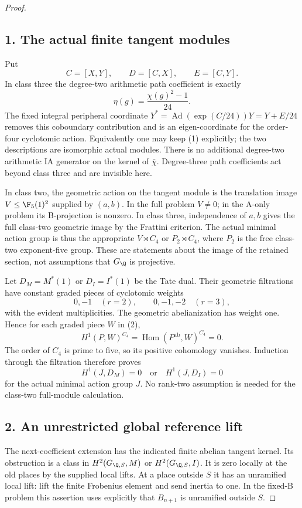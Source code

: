 \begin{proof}
\subsection*{1. The actual finite tangent modules}
Put
\[
 C=[X,Y],\qquad D=[C,X],\qquad E=[C,Y].
\]
In class three the degree-two arithmetic path coefficient is exactly
\[
 \eta(g)=\frac{\chi(g)^2-1}{24}.
 \tag{1}
\]
The fixed integral peripheral coordinate $Y^*=\operatorname{Ad}(\exp(C/24))Y=Y+E/24$ removes this coboundary contribution and is an eigen-coordinate for the order-four cyclotomic action. Equivalently one may keep (1) explicitly; the two descriptions are isomorphic actual modules. There is no additional degree-two arithmetic IA generator on the kernel of $\bar\chi$. Degree-three path coefficients act beyond class three and are invisible here.

In class two, the geometric action on the tangent module is the translation image $V\le\F_5(1)^2$ supplied by $(a,b)$. In the full problem $V\ne0$; in the A-only problem its B-projection is nonzero. In class three, independence of $a,b$ gives the full class-two geometric image by the Frattini criterion. The actual minimal action group is thus the appropriate $V\rtimes C_4$ or $P_2\rtimes C_4$, where $P_2$ is the free class-two exponent-five group. These are statements about the image of the retained section, not assumptions that $G_\Q$ is projective.

Let $D_M=M^*(1)$ or $D_I=I^*(1)$ be the Tate dual. Their geometric filtrations have constant graded pieces of cyclotomic weights
\[
 0,-1 \quad(r=2),\qquad 0,-1,-2 \quad(r=3),
 \tag{2}
\]
with the evident multiplicities. The geometric abelianization has weight one. Hence for each graded piece $W$ in (2),
\[
 H^1(P,W)^{C_4}=\operatorname{Hom}(P^{\mathrm{ab}},W)^{C_4}=0.
\]
The order of $C_4$ is prime to five, so its positive cohomology vanishes. Induction through the filtration therefore proves
\[
 H^1(J,D_M)=0\quad\text{or}\quad H^1(J,D_I)=0
 \tag{3}
\]
for the actual minimal action group $J$. No rank-two assumption is needed for the class-two full-module calculation.

\subsection*{2. An unrestricted global reference lift}
The next-coefficient extension has the indicated finite abelian tangent kernel. Its obstruction is a class in $H^2(G_{\Q,S},M)$ or $H^2(G_{\Q,S},I)$. It is zero locally at the old places by the supplied local lifts. At a place outside $S$ it has an unramified local lift: lift the finite Frobenius element and send inertia to one. In the fixed-B problem this assertion uses explicitly that $B_{n+1}$ is unramified outside $S$.


\end{proof}
